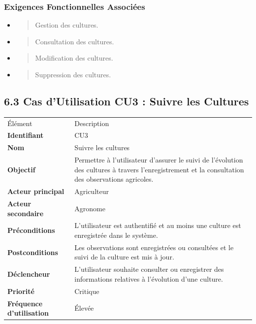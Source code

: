 \documentclass[
]{article}
\begin{document}
\hypertarget{exigences-fonctionnelles-associuxe9es-1}{%
\subsubsection{Exigences Fonctionnelles
Associées}\label{exigences-fonctionnelles-associuxe9es-1}}

\begin{itemize}
\item
  \begin{quote}
  Gestion des cultures.
  \end{quote}
\item
  \begin{quote}
  Consultation des cultures.
  \end{quote}
\item
  \begin{quote}
  Modification des cultures.
  \end{quote}
\item
  \begin{quote}
  Suppression des cultures.
  \end{quote}
\end{itemize}

\hypertarget{cas-dutilisation-cu3-suivre-les-cultures}{%
\subsection{6.3 Cas d'Utilisation CU3 : Suivre les
Cultures}\label{cas-dutilisation-cu3-suivre-les-cultures}}

\begin{longtable}[]{@{}ll@{}}
\toprule
\endhead
Élément & Description \\
\textbf{Identifiant} & CU3 \\
\textbf{Nom} & Suivre les cultures \\
\textbf{Objectif} & Permettre à l'utilisateur d'assurer le suivi de
l'évolution des cultures à travers l'enregistrement et la consultation
des observations agricoles. \\
\textbf{Acteur principal} & Agriculteur \\
\textbf{Acteur secondaire} & Agronome \\
\textbf{Préconditions} & L'utilisateur est authentifié et au moins une
culture est enregistrée dans le système. \\
\textbf{Postconditions} & Les observations sont enregistrées ou
consultées et le suivi de la culture est mis à jour. \\
\textbf{Déclencheur} & L'utilisateur souhaite consulter ou enregistrer
des informations relatives à l'évolution d'une culture. \\
\textbf{Priorité} & Critique \\
\textbf{Fréquence d'utilisation} & Élevée \\
\bottomrule
\end{longtable}
\end{document}

